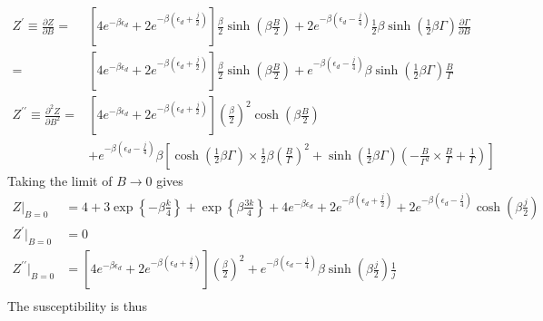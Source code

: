 \documentclass[12pt,twoside]{article}
\numberwithin{equation}{section}
\begin{document}
\begin{equation}\begin{aligned}
	Z^\prime \equiv \frac{\partial{Z}}{\partial{B}} =& \left[4e^{-\beta \epsilon_d} + 2e^{-\beta \left(\epsilon_d + \frac{j}{2}\right)}\right] \frac{\beta}{2}\sinh \left(\beta \frac{B}{2}\right) + 2e^{-\beta\left(\epsilon_d - \frac{j}{4}\right)}\frac{1}{2}\beta \sinh \left(\frac{1}{2}\beta \Gamma\right) \frac{\partial{\Gamma}}{\partial{B}} \\
	=& \left[4e^{-\beta \epsilon_d} + 2e^{-\beta \left(\epsilon_d + \frac{j}{2}\right)}\right] \frac{\beta}{2}\sinh \left(\beta \frac{B}{2}\right) + e^{-\beta\left(\epsilon_d - \frac{j}{4}\right)}\beta \sinh \left(\frac{1}{2}\beta \Gamma \right) \frac{B}{\Gamma}\\
	Z^{\prime\prime} \equiv \frac{\partial^2{Z}}{\partial{B^2}} =& \left[4e^{-\beta \epsilon_d} + 2e^{-\beta \left(\epsilon_d + \frac{j}{2}\right)}\right] \left(\frac{\beta}{2}\right)^2 \cosh \left(\beta \frac{B}{2}\right) \\
								     &+ e^{-\beta\left(\epsilon_d - \frac{j}{4}\right)}\beta \left[\cosh \left(\frac{1}{2}\beta \Gamma \right) \times \frac{1}{2}\beta \left(\frac{B}{\Gamma}\right)^2 + \sinh \left(\frac{1}{2}\beta \Gamma \right) \left(-\frac{B}{\Gamma^2}\times \frac{B}{\Gamma} + \frac{1}{\Gamma} \right)\right]
\end{aligned}\end{equation}
Taking the limit of \(B \to 0\) gives
\begin{equation}\begin{aligned}
	Z\vert_{B=0} &= 4 + 3\exp\left\{-\beta \frac{k}{4}\right\} + \exp\left\{\beta \frac{3k}{4}\right\} + 4e^{-\beta \epsilon_d} + 2e^{-\beta \left(\epsilon_d + \frac{j}{2}\right)} + 2e^{-\beta\left(\epsilon_d - \frac{j}{4}\right)}\cosh \left(\beta \frac{j}{2}\right)\\
	Z^\prime\vert_{B=0} &= 0\\
	Z^{\prime\prime}\vert_{B=0} &= \left[4e^{-\beta \epsilon_d} + 2e^{-\beta \left(\epsilon_d + \frac{j}{2}\right)}\right] \left(\frac{\beta}{2}\right)^2 + e^{-\beta\left(\epsilon_d - \frac{j}{4}\right)}\beta \sinh \left(\beta \frac{j}{2} \right) \frac{1}{j}\\
\end{aligned}\end{equation}
The susceptibility is thus
\end{document}
